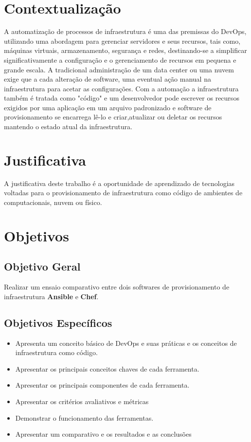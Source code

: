 \section{\esp Contextualização}
A automatização de processos de infraestrutura é uma das premissas do DevOps, utilizando uma abordagem para gerenciar servidores e seus recursos, tais como, máquinas virtuais, armazenamento, segurança e redes, destinando-se a simplificar significativamente a configuração e o gerenciamento de recursos em pequena e grande escala. A tradicional administração de um data center ou uma nuvem exige que a cada alteração de software, uma eventual ação manual na infraestrutura para acetar as configurações. Com a automação a infraestrutura também é tratada como "código" e um desenvolvedor pode escrever os recursos exigidos por uma aplicação em um arquivo padronizado e software de provisionamento se encarrega lê-lo e criar,atualizar ou deletar os recursos mantendo o estado atual da infraestrutura. 


\section{\esp Justificativa}
A justificativa deste trabalho é a oportunidade de aprendizado de tecnologias voltadas para o provisionamento de infraestrutura como código de ambientes de computacionais, nuvem ou físico.  

\section{\esp Objetivos}
\subsection{\esp Objetivo Geral}

Realizar um ensaio comparativo entre dois softwares de provisionamento de infraestrutura \textbf{Ansible} e \textbf{Chef}.

\subsection{\esp Objetivos Específicos}
\begin{itemize}
\item Apresenta um conceito básico de DevOps e suas práticas e os conceitos de infraestrutura como código.
\item Apresentar os principais conceitos chaves de cada ferramenta.
\item Apresentar os principais componentes de cada ferramenta.
\item Apresentar os critérios avaliativos e  métricas
\item Demonstrar o funcionamento das ferramentas.
\item Apresentar um comparativo e os resultados e as conclusões 
\end{itemize}
